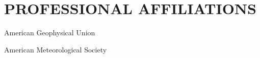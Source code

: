 \documentclass[11pt, letterpaper]{article} %
\begin{document}
\section*{PROFESSIONAL AFFILIATIONS}\label{professional-affiliations}

  American Geophysical Union

  American Meteorological Society







\end{document}
